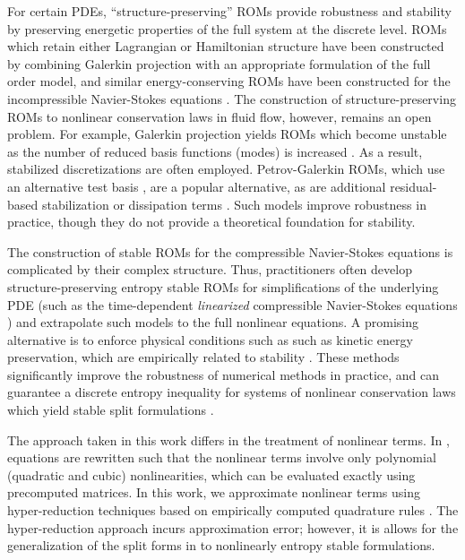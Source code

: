 \documentclass[preprint,10pt]{elsarticle}
\theoremstyle{definition}
\theoremstyle{lemma}
\theoremstyle{theorem}
\theoremstyle{assumption}
\begin{document}
For certain PDEs, ``structure-preserving'' ROMs provide robustness and stability by preserving energetic properties of the full system at the discrete level.  ROMs which retain either Lagrangian \cite{lall2003structure, carlberg2015preserving} or Hamiltonian structure \cite{benner2012interpolation, gugercin2012structure, peng2016symplectic, chaturantabut2016structure, gong2017structure, afkham2017structure, afkham2018structure} have been constructed by combining Galerkin projection with an appropriate formulation of the full order model, and similar energy-conserving ROMs have been constructed for the incompressible Navier-Stokes equations \cite{farhat2014dimensional, farhat2015structure}.  The construction of structure-preserving ROMs to nonlinear conservation laws in fluid flow, however, remains an open problem.  For example, Galerkin projection yields ROMs which become unstable as the number of reduced basis functions (modes) is increased \cite{bui2007goal, carlberg2013gnat}.  As a result, stabilized discretizations are often employed.  Petrov-Galerkin ROMs, which use an alternative test basis \cite{maday2002blackbox, rozza2007stability, bui2007goal, serre2012reliable, amsallem2012stabilization, rozza2013reduced, ballarin2015supremizer, carlberg2017galerkin}, are a popular alternative, as are additional residual-based stabilization or dissipation terms \cite{wang2012proper, kalashnikova2014stabilization, caiazzo2014numerical, balajewicz2016minimal}.  Such models improve robustness in practice, though they do not provide a theoretical foundation for stability.  

The construction of stable ROMs for the compressible Navier-Stokes equations is complicated by their complex structure.  Thus, practitioners often develop structure-preserving entropy stable ROMs for simplifications of the underlying PDE (such as the time-dependent \textit{linearized} compressible Navier-Stokes equations \cite{barone2009stable, kalashnikova2010stability, amsallem2012stabilization, kalashnikova2014construction}) and extrapolate such models to the full nonlinear equations.  A promising alternative is to enforce physical conditions such as such as kinetic energy preservation, which are empirically related to stability \cite{maboudi2018conservative}.  These methods significantly improve the robustness of numerical methods in practice, and can guarantee a discrete entropy inequality for systems of nonlinear conservation laws which yield stable split formulations \cite{fisher2013discretely}.  

The approach taken in this work differs in the treatment of nonlinear terms.  In \cite{maboudi2018conservative}, equations are rewritten such that the nonlinear terms involve only polynomial (quadratic and cubic) nonlinearities, which can be evaluated exactly using precomputed matrices.  In this work, we approximate nonlinear terms using hyper-reduction techniques based on empirically computed quadrature rules \cite{an2008optimizing, hernandez2017dimensional}.  The hyper-reduction approach incurs approximation error; however, it is allows for the generalization of the split forms in \cite{maboudi2018conservative} to nonlinearly entropy stable formulations.
\end{document}

